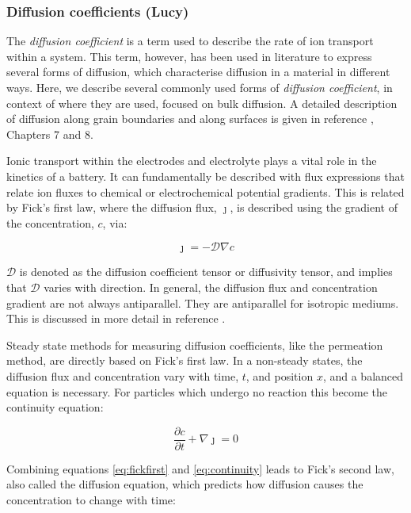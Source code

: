 \documentclass[../main.tex]{subfiles}
\begin{document}
\subsubsection{Diffusion coefficients (Lucy)}
\label{sec:diffusion}

The \textit{diffusion coefficient} is a term used to describe the rate of ion transport within a system. This term, however, has been used in literature to express several forms of diffusion, which characterise diffusion in a material in different ways. Here, we describe several commonly used forms of \textit{diffusion coefficient}, in context of where they are used, focused on bulk diffusion. A detailed description of diffusion along grain boundaries and along surfaces is given in reference , Chapters 7 and 8.

Ionic transport within the electrodes and electrolyte plays a vital role in the kinetics of a battery. It can fundamentally be described with flux expressions that relate ion fluxes to chemical or electrochemical potential gradients. This is related by Fick's first law, where the diffusion flux, $\boldsymbol{\jmath}$, is described using the gradient of the concentration, $c$, via:

\begin{equation}
    \boldsymbol{\jmath} = - \mathcal{D} \nabla c
    \label{eq:fickfirst}
\end{equation}

$\mathcal{D}$ is denoted as the diffusion coefficient tensor or diffusivity tensor, and implies that $\mathcal{D}$ varies with direction. In general, the diffusion flux and concentration gradient are not always antiparallel. They are antiparallel for isotropic mediums. This is discussed in more detail in reference .

Steady state methods for measuring diffusion coefficients, like the permeation method, \cite{heumann2013diffusion} are directly based on Fick's first law. In a non-steady states, the diffusion flux and concentration vary with time, $t$, and position $x$, and a balanced equation is necessary. For particles which undergo no reaction this become the continuity equation:

\begin{equation}
    \frac{\partial c}{\partial t} + \nabla {\boldsymbol{\jmath}} = 0
    \label{eq:continuity}
\end{equation}

Combining equations \ref{eq:fickfirst} and \ref{eq:continuity} leads to Fick's second law, also called the diffusion equation, which predicts how diffusion causes the concentration to change with time:
\end{document}
